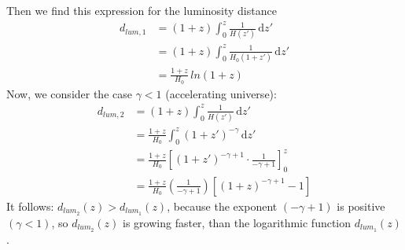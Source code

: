 \documentclass[a4paper,12pt]{article}
\begin{document}
\begin{enumerate}
\begin{enumerate}
Then we find this expression for the luminosity distance	
\begin{align*}
d_{lum,1}&=(1+z)\int_0^z \! \frac{1}{H(z')} \, \mathrm{d}z'\\
			&=(1+z)\int_0^z \! \frac{1}{H_0(1+z')} \, \mathrm{d}z'\\
			&=\frac{1+z}{H_0}\,ln(1+z)
\end{align*}						
	Now, we consider the case $\gamma < 1$ (accelerating universe):
	\begin{align*}
				d_{lum,2}&=(1+z)\int_0^z \! \frac{1}{H(z')} \, \mathrm{d}z'\\
				&=\frac{1+z}{H_0}\int_0^z \! (1+z')^{- \gamma} \, \mathrm{d}z'\\
				&=\frac{1+z}{H_0}\left[(1+z')^{- \gamma + 1}\cdot \frac{1}{- \gamma + 1}\right]_0^z\\
				&=\frac{1+z}{H_0}\left(\frac{1}{- \gamma + 1}\right)\left[(1+z)^{- \gamma + 1}-1\right]
\end{align*}	
It follows:
$d_{lum_2}(z)>d_{lum_1}(z)$, because the exponent $(- \gamma + 1)$ is positive $(\gamma < 1)$,
so $d_{lum_2}(z)$ is growing faster, than the logarithmic function $d_{lum_1}(z)$.		
		\end{enumerate}
		
	\end{enumerate}
		
\end{document}
